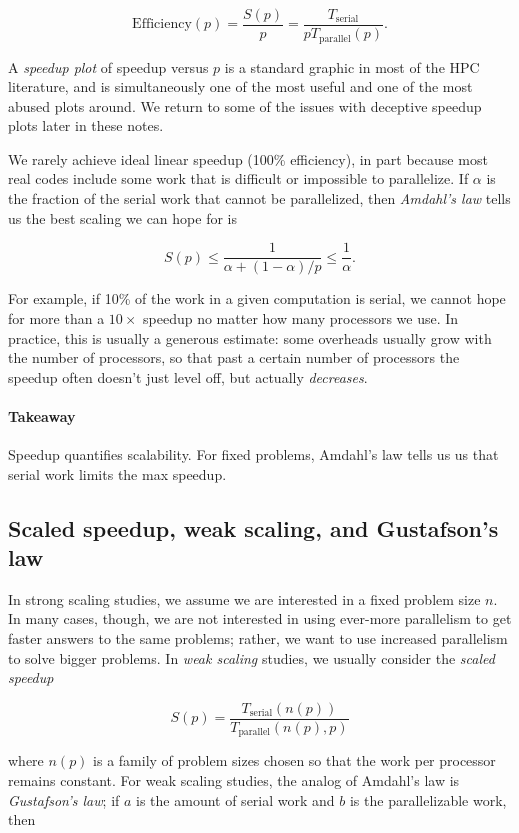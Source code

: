 \documentclass[12pt, leqno]{article} %
\begin{document}
\[
  \mbox{Efficiency}(p)
    = \frac{S(p)}{p}
    = \frac{T_{\mathrm{serial}}}{p T_{\mathrm{parallel}}(p)}.
\]

A \emph{speedup plot} of speedup versus $p$ is a standard graphic in
most of the HPC literature, and is simultaneously one of the most useful
and one of the most abused plots around. We return to some of the issues
with deceptive speedup plots later in these notes.

We rarely achieve ideal linear speedup (100\% efficiency), in part
because most real codes include some work that is difficult or
impossible to parallelize. If $\alpha$ is the fraction of the serial
work that cannot be parallelized, then \emph{Amdahl's law} tells us the
best scaling we can hope for is

\[
  S(p) \leq \frac{1}{\alpha+(1-\alpha)/p} \leq \frac{1}{\alpha}.
\]

For example, if 10\% of the work in a given computation is serial, we
cannot hope for more than a $10 \times$ speedup no matter how many
processors we use. In practice, this is usually a generous estimate:
some overheads usually grow with the number of processors, so that past
a certain number of processors the speedup often doesn't just level off,
but actually \emph{decreases}.

\paragraph{Takeaway}

Speedup quantifies scalability. For fixed problems, Amdahl's law tells
us us that serial work limits the max speedup.

\subsection{Scaled speedup, weak scaling, and Gustafson's law}

In strong scaling studies, we assume we are interested in a fixed
problem size $n$. In many cases, though, we are not interested in using
ever-more parallelism to get faster answers to the same problems;
rather, we want to use increased parallelism to solve bigger problems.
In \emph{weak scaling} studies, we usually consider the \emph{scaled
speedup}

\[
S(p) = \frac{T_{\mathrm{serial}}(n(p))}
            {T_{\mathrm{parallel}}(n(p),p)}
\]

where $n(p)$ is a family of problem sizes chosen so that the work per
processor remains constant. For weak scaling studies, the analog of
Amdahl's law is \emph{Gustafson's law}; if $a$ is the amount of serial
work and $b$ is the parallelizable work, then
\end{document}
